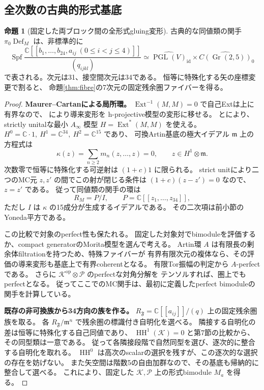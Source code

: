 \documentclass[a4paper,11pt]{ltjsarticle}
\theoremstyle{definition}
\newtheorem{theorem}{命題}[section]
\newcommand{\CC}{\mathbb C}
\newcommand{\HH}{\operatorname{HH}}
\newcommand{\Gr}{\operatorname{Gr}}
\newcommand{\Spf}{\operatorname{Spf}}
\newcommand{\Def}{\operatorname{Def}}
\newcommand{\Ext}{\operatorname{Ext}}
\newcommand{\id}{\operatorname{id}}
\begin{document}
\subsection{全次数の古典的形式基底}

\begin{theorem}[固定した両ブロック間の全形式gluing変形]\label{thm:full-gluing-base}
古典的な同値類の関手 $\pi_0\Def_M$ は、非標準的に
\[
 \Spf
 \frac{\CC[[b_1,\ldots,b_{24},a_{ij}\ (0\le i<j\le4)]]}
 {(q_{ijkl})}
 \simeq
 \widehat{\operatorname{PGL}(V)}_{\id}
 \times\widehat{C(\Gr(2,5))}_0
\]
で表される。次元は31、接空間次元は34である。
恒等に特殊化する矢の座標変更で割ると、
命題\ref{thm:fibre}の7次元の固定残余圏ファイバーを得る。
\end{theorem}

\begin{proof}
\textbf{Maurer--Cartanによる局所環。}
$\Ext^{-1}(M,M)=0$ で自己Extは上に有界なので、
\cite[Theorem 11.8, Proposition 11.10]{ELOII}により導来変形を
h-projective模型の変形に移せる。
\cite[Proposition 6.1]{ELOI}と\cite[Theorem 7.2]{ELOII}により、
strictly unitalな最小 $A_\infty$ 模型 $H=\Ext^*(M,M)$ を使える。
$H^0=\CC\cdot1,\ H^1=\CC^{34},\ H^2=\CC^{15}$ であり、
可換Artin基底の極大イデアル $\mathfrak m$ 上の方程式は
\[
 \kappa(z)=\sum_{n\ge2}m_n(z,\ldots,z)=0,\qquad
 z\in H^1\otimes\mathfrak m.
\]
次数零で恒等に特殊化する可逆射は $(1+c)1$ に限られる。
strict unitにより二つのMC元 $z,z'$ の間でこの射が閉じる条件は
$(1+c)(z-z')=0$ なので、$z=z'$ である。
従って同値類の関手の環は
\[
 R_M=P/I,\qquad P=\CC[[z_1,\ldots,z_{34}]],
\]
ただし $I$ は $\kappa$ の15成分が生成するイデアルである。
その二次項は前小節のYoneda平方である。

この比較で対象のperfect性も保たれる。
固定した対象対でbimoduleを評価するか、compact generatorのMorita模型を選んで考える。
Artin環 $A$ は有限長の剰余体filtrationを持つため、特殊ファイバーが
有界有限次元の複体なら、その評価の導来変形も基底上で有界coherentとなる。
有限Tor振幅の判定から $A$-perfectである。
さらに $\mathcal K^{\mathrm{op}}\otimes\mathcal P$ のperfectな対角分解を
テンソルすれば、圏上でもperfectとなる。
従ってここでのMC関手は、最初に定義したperfect bimoduleの関手を計算している。

\textbf{既存の非可換族から34方向の族を作る。}
$R_{\mathfrak F}=\CC[[a_{ij}]]/(q)$ 上の固定残余圏族を取る。
各 $R_{\mathfrak F}/\mathfrak m^n$ で残余圏の標識付き自明化を選べる。
隣接する自明化の差は恒等に特殊化する自己同値であり、
$\HH^1(\mathcal K)=0$ と第7節の比較から、その同型類は一意である。
従って各隣接段階で自然同型を選び、逐次的に整合する自明化を取れる。
$\HH^0$ は高次のscalarの選択を残すが、この逐次的な選択の存在を妨げない。
また矢空間は階数5の自由加群なので、その基底も帰納的に整合して選べる。
これにより、固定した $\mathcal K,\mathcal P$ 上の形式bimodule $M_a$ を得る。


\end{proof}
\end{document}
